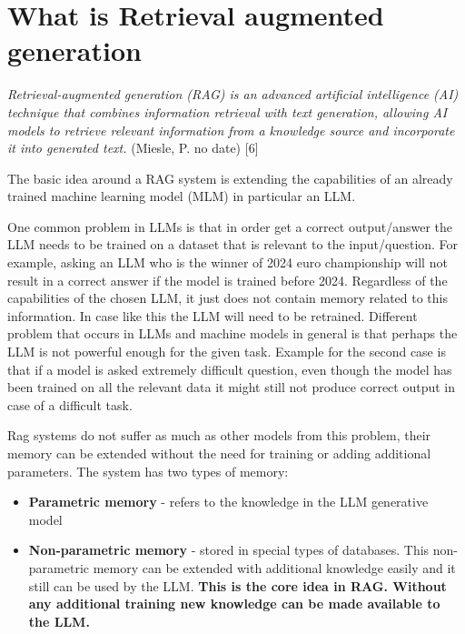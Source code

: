 \documentclass[11pt]{wseas}
\begin{document}
    \newpage

\section{What is Retrieval augmented
generation}\label{what-is-retrieval-augmented-generation}

\emph{Retrieval-augmented generation (RAG) is an advanced artificial
intelligence (AI) technique that combines information retrieval with
text generation, allowing AI models to retrieve relevant information
from a knowledge source and incorporate it into generated text.}
(Miesle, P. no date) {[}6{]}

The basic idea around a RAG system is extending the capabilities of an
already trained machine learning model (MLM) in particular an LLM.

One common problem in LLMs is that in order get a correct output/answer
the LLM needs to be trained on a dataset that is relevant to the
input/question. For example, asking an LLM who is the winner of 2024
euro championship will not result in a correct answer if the model is
trained before 2024. Regardless of the capabilities of the chosen LLM,
it just does not contain memory related to this information. In case
like this the LLM will need to be retrained. Different problem that
occurs in LLMs and machine models in general is that perhaps the LLM is
not powerful enough for the given task. Example for the second case is
that if a model is asked extremely difficult question, even though the
model has been trained on all the relevant data it might still not
produce correct output in case of a difficult task.

Rag systems do not suffer as much as other models from this problem,
their memory can be extended without the need for training or adding
additional parameters. The system has two types of memory:

\begin{itemize}
\tightlist
\item
  \textbf{Parametric memory} - refers to the knowledge in the LLM
  generative model
\item
  \textbf{Non-parametric memory} - stored in special types of databases.
  This non-parametric memory can be extended with additional knowledge
  easily and it still can be used by the LLM. \textbf{This is the core
  idea in RAG. Without any additional training new knowledge can be made
  available to the LLM.}
\end{itemize}
\end{document}
